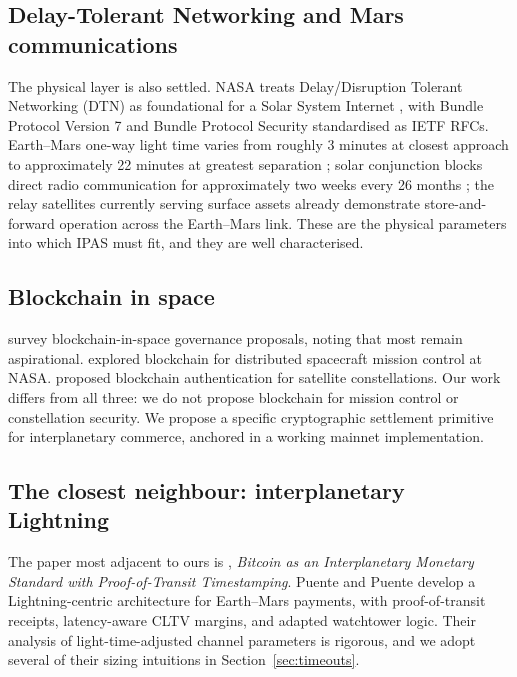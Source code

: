 \documentclass[11pt]{article}
\begin{document}
\subsection{Delay-Tolerant Networking and Mars communications}

The physical layer is also settled. NASA treats Delay/Disruption Tolerant Networking (DTN) as foundational for a Solar System Internet \citep{nasa2023dtn, nasa2026dtn}, with Bundle Protocol Version 7 \citep{burleigh2022bpv7} and Bundle Protocol Security \citep{birrane2022bpsec} standardised as IETF RFCs. Earth--Mars one-way light time varies from roughly 3 minutes at closest approach to approximately 22 minutes at greatest separation \citep{nasa2020spacecomms}; solar conjunction blocks direct radio communication for approximately two weeks every 26 months \citep{nasa2019conjunction}; the relay satellites currently serving surface assets \citep{nasa2026relay} already demonstrate store-and-forward operation across the Earth--Mars link. These are the physical parameters into which IPAS must fit, and they are well characterised.

\subsection{Blockchain in space}

\citet{defilippi2021blockchain} survey blockchain-in-space governance proposals, noting that most remain aspirational. \citet{mandl2017} explored blockchain for distributed spacecraft mission control at NASA. \citet{torky2022} proposed blockchain authentication for satellite constellations. Our work differs from all three: we do not propose blockchain for mission control or constellation security. We propose a specific cryptographic settlement primitive for interplanetary commerce, anchored in a working mainnet implementation.

\subsection{The closest neighbour: interplanetary Lightning}

The paper most adjacent to ours is \citet{puente2025}, \emph{Bitcoin as an Interplanetary Monetary Standard with Proof-of-Transit Timestamping}. Puente and Puente develop a Lightning-centric architecture for Earth--Mars payments, with proof-of-transit receipts, latency-aware CLTV margins, and adapted watchtower logic. Their analysis of light-time-adjusted channel parameters is rigorous, and we adopt several of their sizing intuitions in Section~\ref{sec:timeouts}.
\end{document}

